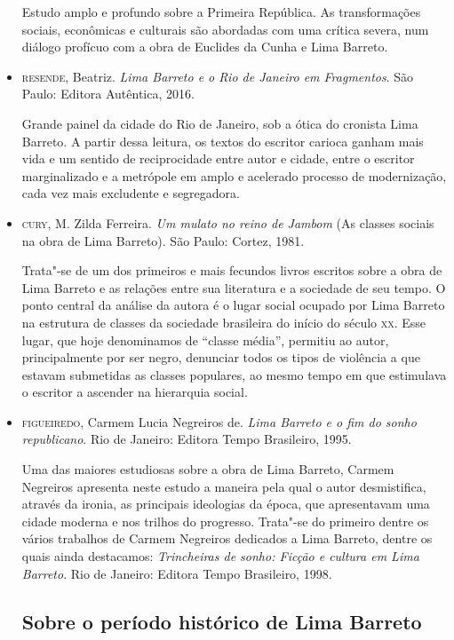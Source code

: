 \documentclass[11pt]{extarticle}
\begin{document}
\begin{itemize}
Estudo amplo e profundo sobre a Primeira República. As transformações
sociais, econômicas e culturais são abordadas com uma crítica severa,
num diálogo profícuo com a obra de Euclides da Cunha e Lima Barreto.

\item \textsc{resende}, Beatriz. \emph{Lima Barreto e o Rio de Janeiro em Fragmentos}.
São Paulo: Editora Autêntica, 2016. 

Grande painel da cidade do Rio de Janeiro, 
sob a ótica do cronista Lima Barreto. A partir dessa leitura, os textos 
do escritor carioca ganham mais vida e um sentido de reciprocidade entre 
autor e cidade, entre o escritor marginalizado e a metrópole em amplo 
e acelerado processo de modernização, cada vez mais excludente e segregadora.

\item \textsc{cury}, M. Zilda Ferreira. \emph{Um mulato no reino de
Jambom} (As classes sociais na obra de Lima Barreto). São
Paulo: Cortez, 1981. 

Trata"-se de um dos primeiros e mais fecundos livros
escritos sobre a obra de Lima Barreto e as relações entre sua literatura
e a sociedade de seu tempo. O ponto central da análise da autora é o
lugar social ocupado por Lima Barreto na estrutura de classes da
sociedade brasileira do início do século \textsc{xx}. Esse lugar, que hoje
denominamos de ``classe média'', permitiu ao autor, principalmente por
ser negro, denunciar todos os tipos de violência a que estavam
submetidas as classes populares, ao mesmo tempo em que estimulava o
escritor a ascender na hierarquia social.

\item \textsc{figueiredo}, Carmem Lucia Negreiros de. \emph{Lima Barreto e o fim do
sonho republicano}. Rio de Janeiro: Editora Tempo Brasileiro, 1995. 

Uma
das maiores estudiosas sobre a obra de Lima Barreto, Carmem Negreiros
apresenta neste estudo a maneira pela qual o autor desmistifica, através
da ironia, as principais ideologias da época, que apresentavam uma
cidade moderna e nos trilhos do progresso. Trata"-se do primeiro dentre
os vários trabalhos de Carmem Negreiros dedicados a Lima Barreto, dentre
os quais ainda destacamos: \emph{Trincheiras de sonho: Ficção e cultura
em Lima Barreto}. Rio de Janeiro: Editora Tempo Brasileiro, 1998.

\subsection{Sobre o período histórico de Lima Barreto}


\end{itemize}
\end{document}
